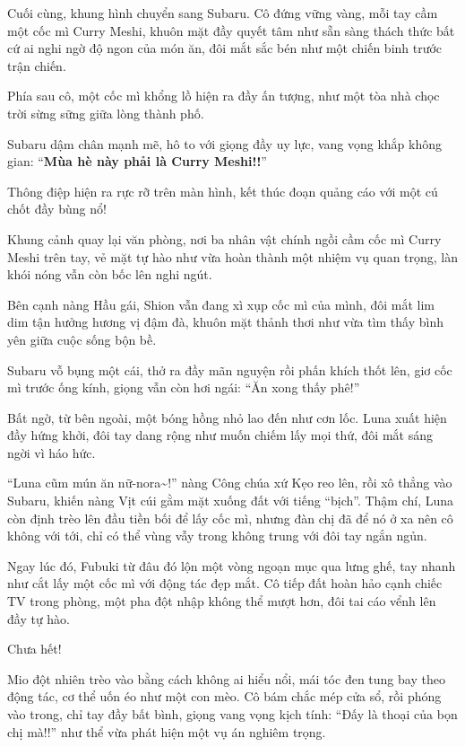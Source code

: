 \documentclass[../main.tex]{subfiles}
\begin{document}

Cuối cùng, khung hình chuyển sang Subaru. Cô đứng vững vàng, mỗi tay cầm một cốc mì Curry Meshi, khuôn mặt đầy quyết tâm như sẵn sàng thách thức bất cứ ai nghi ngờ độ ngon của món ăn, đôi mắt sắc bén như một chiến binh trước trận chiến.

Phía sau cô, một cốc mì khổng lồ hiện ra đầy ấn tượng, như một tòa nhà chọc trời sừng sững giữa lòng thành phố.

Subaru dậm chân mạnh mẽ, hô to với giọng đầy uy lực, vang vọng khắp không gian: ``\textbf{Mùa hè này phải là Curry Meshi!!}''

Thông điệp hiện ra rực rỡ trên màn hình, kết thúc đoạn quảng cáo với một cú chốt đầy bùng nổ!


Khung cảnh quay lại văn phòng, nơi ba nhân vật chính ngồi cầm cốc mì Curry Meshi trên tay, vẻ mặt tự hào như vừa hoàn thành một nhiệm vụ quan trọng, làn khói nóng vẫn còn bốc lên nghi ngút.

Bên cạnh nàng Hầu gái, Shion vẫn đang xì xụp cốc mì của mình, đôi mắt lim dim tận hưởng hương vị đậm đà, khuôn mặt thảnh thơi như vừa tìm thấy bình yên giữa cuộc sống bộn bề.

Subaru vỗ bụng một cái, thở ra đầy mãn nguyện rồi phấn khích thốt lên, giơ cốc mì trước ống kính, giọng vẫn còn hơi ngái: ``Ăn xong thấy phê!''

Bất ngờ, từ bên ngoài, một bóng hồng nhỏ lao đến như cơn lốc. Luna xuất hiện đầy hứng khởi, đôi tay dang rộng như muốn chiếm lấy mọi thứ, đôi mắt sáng ngời vì háo hức.

``Luna cũm mún ăn nữ-nora\~{}!'' nàng Công chúa xứ Kẹo reo lên, rồi xô thẳng vào Subaru, khiến nàng Vịt cúi gằm mặt xuống đất với tiếng ``bịch''. Thậm chí, Luna còn định trèo lên đầu tiền bối để lấy cốc mì, nhưng đàn chị đã để nó ở xa nên cô không với tới, chỉ có thể vùng vẫy trong không trung với đôi tay ngắn ngủn.

Ngay lúc đó, Fubuki từ đâu đó lộn một vòng ngoạn mục qua lưng ghế, tay nhanh như cắt lấy một cốc mì với động tác đẹp mắt. Cô tiếp đất hoàn hảo cạnh chiếc TV trong phòng, một pha đột nhập không thể mượt hơn, đôi tai cáo vểnh lên đầy tự hào.

Chưa hết!

Mio đột nhiên trèo vào bằng cách không ai hiểu nổi, mái tóc đen tung bay theo động tác, cơ thể uốn éo như một con mèo. Cô bám chắc mép cửa sổ, rồi phóng vào trong, chỉ tay đầy bất bình, giọng vang vọng kịch tính: ``Đấy là thoại của bọn chị mà!!'' như thể vừa phát hiện một vụ án nghiêm trọng.
\end{document}

